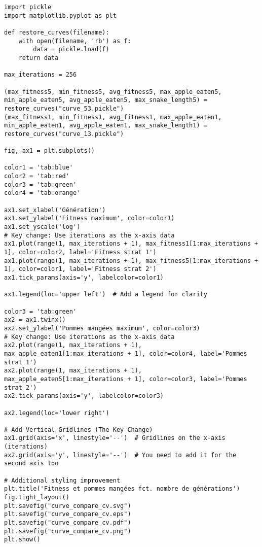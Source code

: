 \documentclass[11pt,a4paper]{article}
\begin{document}
\begin{verbatim}
import pickle
import matplotlib.pyplot as plt

def restore_curves(filename):
    with open(filename, 'rb') as f:
        data = pickle.load(f)
    return data

max_iterations = 256

(max_fitness5, min_fitness5, avg_fitness5, max_apple_eaten5, min_apple_eaten5, avg_apple_eaten5, max_snake_length5) = restore_curves("curve_53.pickle")
(max_fitness1, min_fitness1, avg_fitness1, max_apple_eaten1, min_apple_eaten1, avg_apple_eaten1, max_snake_length1) = restore_curves("curve_13.pickle")

fig, ax1 = plt.subplots()

color1 = 'tab:blue'
color2 = 'tab:red'
color3 = 'tab:green'
color4 = 'tab:orange'

ax1.set_xlabel('Génération')
ax1.set_ylabel('Fitness maximum', color=color1)
ax1.set_yscale('log')
# Key change: Use iterations as the x-axis data
ax1.plot(range(1, max_iterations + 1), max_fitness1[1:max_iterations + 1], color=color2, label='Fitness strat 1')
ax1.plot(range(1, max_iterations + 1), max_fitness5[1:max_iterations + 1], color=color1, label='Fitness strat 2')
ax1.tick_params(axis='y', labelcolor=color1)

ax1.legend(loc='upper left')  # Add a legend for clarity

color3 = 'tab:green'
ax2 = ax1.twinx()
ax2.set_ylabel('Pommes mangées maximum', color=color3)
# Key change: Use iterations as the x-axis data
ax2.plot(range(1, max_iterations + 1), max_apple_eaten1[1:max_iterations + 1], color=color4, label='Pommes strat 1')
ax2.plot(range(1, max_iterations + 1), max_apple_eaten5[1:max_iterations + 1], color=color3, label='Pommes strat 2')
ax2.tick_params(axis='y', labelcolor=color3)

ax2.legend(loc='lower right')

# Add Vertical Gridlines (The Key Change)
ax1.grid(axis='x', linestyle='--')  # Gridlines on the x-axis (iterations)
ax2.grid(axis='y', linestyle='--')  # You need to add it for the second axis too

# Additional styling improvement
plt.title('Fitness et pommes mangées fct. nombre de générations')
fig.tight_layout()
plt.savefig("curve_compare_cv.svg")
plt.savefig("curve_compare_cv.eps")
plt.savefig("curve_compare_cv.pdf")
plt.savefig("curve_compare_cv.png")
plt.show()
\end{verbatim}
\end{document}
